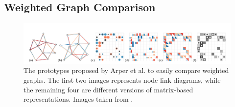 \documentclass{article}
\begin{document}
\begin{multicols}{2}
\subsection{Weighted Graph Comparison}
\label{subsec:weightedGraph}
\begin{figure}[ht]
\centering
\includegraphics[width = 1.8\columnwidth]{weightedGraphs}
\caption{The prototypes proposed by Arper et al. to easily compare weighted graphs. The first two images represents node-link diagrams, while the remaining four are different versions of matrix-based representations. Images taken from \cite{weightedGraphComparison}.}
\label{fig:weightedGraph}
\end{figure}


\end{multicols}
\end{document}
